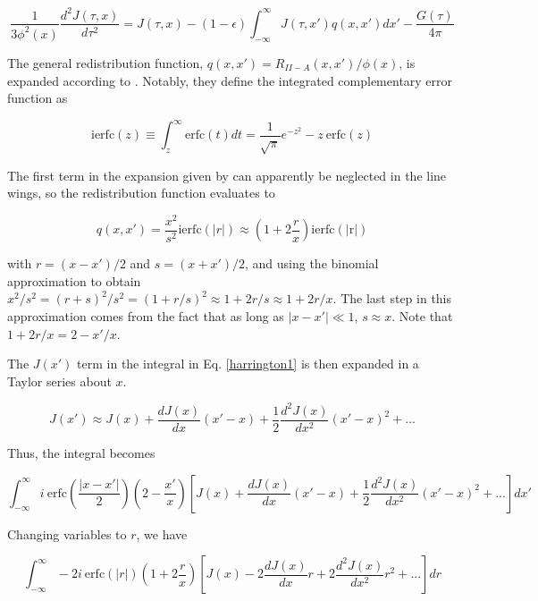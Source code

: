 \documentclass[onecolumn]{aastex63}
\begin{document}
\begin{equation} \label{harrington1}
    \frac{1}{3\phi^2(x)}\frac{d^2J(\tau, x)}{d\tau^2} = J(\tau, x) - (1-\epsilon)\int_{-\infty}^{\infty}J(\tau, x')q(x, x')dx' - \frac{G(\tau)}{4\pi}
\end{equation}

The general redistribution function, $q(x, x') = R_{II-A}(x, x')/\phi (x)$, is expanded according to \cite{1971JQSRT..11.1365A}. Notably, they define the integrated complementary error function as 

\begin{equation}
    \mathrm{ierfc}(z) \equiv \int_z^{\infty} \mathrm{erfc}(t) dt = \frac{1}{\sqrt{\pi}} e^{-z^2} - z\  \mathrm{erfc}(z)
\end{equation}

The first term in the expansion given by can apparently be neglected in the line wings, so the redistribution function evaluates to 

\begin{equation}
    q(x, x') = \frac{x^2}{s^2} \mathrm{ierfc}(|r|) \approx \left(1+2\frac{r}{x}\right)\mathrm{ierfc(|r|)}
\end{equation}

with $r=(x-x')/2$ and $s=(x+x')/2$, and using the binomial approximation to obtain $x^2/s^2 = (r+s)^2/s^2 = (1+r/s)^2 \approx 1 + 2r/s \approx 1 + 2r/x$. The last step in this approximation comes from the fact that as long as $|x-x'|\ll 1$, $s \approx x$. Note that $1 + 2r/x = 2 - x'/x$.

The $J(x')$ term in the integral in Eq. \ref{harrington1} is then expanded in a Taylor series about $x$.

\begin{equation}
    J(x') \approx J(x) + \frac{dJ(x)}{dx}(x' - x) + \frac{1}{2}\frac{d^2J(x)}{dx^2}(x'-x)^2 + ...
\end{equation}

Thus, the integral becomes

\begin{equation}
    \int_{-\infty}^{\infty}i\ \mathrm{erfc}\left(\frac{|x-x'|}{2}\right)\left(2-\frac{x'}{x}\right)\left[J(x) + \frac{dJ(x)}{dx}(x' - x) + \frac{1}{2}\frac{d^2J(x)}{dx^2}(x'-x)^2 + ...\right] dx'
\end{equation}

Changing variables to $r$, we have

\begin{equation}
    \int_{-\infty}^{\infty}-2i\ \mathrm{erfc}\left(|r|\right)\left(1+2\frac{r}{x}\right)\left[J(x) - 2\frac{dJ(x)}{dx}r + 2\frac{d^2J(x)}{dx^2}r^2 + ...\right] dr
\end{equation}
\end{document}
